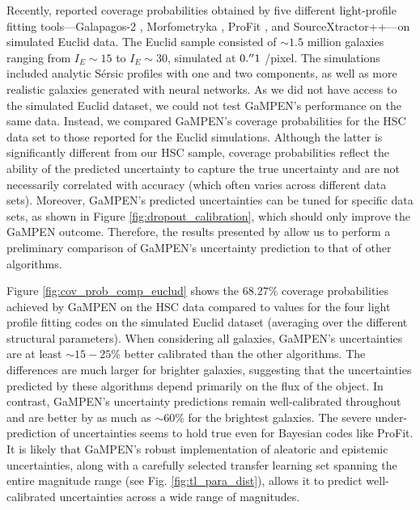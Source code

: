 \documentclass[linenumbers,twocolumn,twocolappendix]{aastex631}
\newcommand\sersic{S\'ersic}
\newcommand\gampen{GaMPEN}
\begin{document}
\begin{CJK*}{UTF8}{gbsn}
Recently, \citet{euclid_morph} reported coverage probabilities obtained by five different light-profile fitting tools---Galapagos-2 \citep{galapagos}, Morfometryka \citep{morfometryka}, ProFit \citep{profit}, and SourceXtractor++\citep{srcx++}---on simulated Euclid data. The Euclid sample consisted of $\sim1.5$ million galaxies ranging from $I_E\sim15$ to $I_E\sim30$, simulated at $0.\mbox{$^{\prime\prime}$}1$ /pixel. The simulations included analytic \sersic{} profiles with one and two components, as well as more realistic galaxies generated with neural networks. 
As we did not have access to the simulated Euclid dataset, we could not test \gampen{}'s performance on the same data. 
Instead, we compared \gampen{}'s coverage probabilities for the HSC data set to those reported for the Euclid simulations. 
Although the %
latter is significantly different from our HSC sample, coverage probabilities reflect the ability of the predicted uncertainty to capture the true uncertainty and are not necessarily correlated with accuracy (which often varies across different data sets). Moreover, \gampen{}'s predicted uncertainties can be tuned for specific data sets, as shown in Figure \ref{fig:dropout_calibration}, which should only improve the \gampen{} outcome. Therefore, the results presented by \citet{euclid_morph} allow us to perform a preliminary comparison of \gampen{}'s uncertainty prediction to that of other algorithms.

Figure \ref{fig:cov_prob_comp_euclud} shows the $68.27\%$ coverage probabilities achieved by \gampen{} on the HSC data compared to values for the four light profile fitting codes on the simulated Euclid dataset %
(averaging over the different structural parameters). %
When considering all galaxies, \gampen{}'s uncertainties are at least $\sim15-25\%$ better calibrated than the other algorithms. 
The differences are much larger for brighter galaxies,
suggesting that the uncertainties predicted by these algorithms depend primarily on the flux of the object. In contrast, \gampen{}'s uncertainty predictions remain well-calibrated throughout and are better by as much as $\sim60\%$ for the brightest galaxies. The severe under-prediction of uncertainties seems to hold true even for Bayesian codes like ProFit. 
It is likely that 
\gampen{}'s robust implementation of aleatoric and epistemic uncertainties, along with a carefully selected transfer learning set spanning the entire magnitude range (see Fig. \ref{fig:tl_para_dist}), allows it to predict well-calibrated uncertainties across a wide range of magnitudes. 




\end{CJK*}
\end{document}
